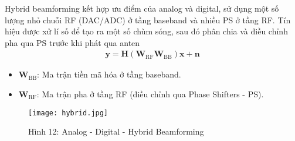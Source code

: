 \documentclass[a4paper,13pt]{article}
\begin{document}
Hybrid beamforming kết hợp ưu điểm của analog và digital, sử dụng một số lượng nhỏ chuỗi RF (DAC/ADC) ở tầng baseband và nhiều PS ở tầng RF. Tín hiệu được xử lí số để tạo ra một số chùm sóng, sau đó phân chia và điều chỉnh pha qua PS trước khi phát qua anten
\begin{align}
\mathbf{y} = \mathbf{H} (\mathbf{W}_{\text{RF}} \mathbf{W}_{\text{BB}}) \mathbf{x} + \mathbf{n} \tag{7}
\end{align}
\begin{itemize}
    \item \(\mathbf{W}_{\text{BB}}\): Ma trận tiền mã hóa ở tầng baseband.
    \item \(\mathbf{W}_{\text{RF}}\): Ma trận pha ở tầng RF (điều chỉnh qua Phase Shifters - PS).
\end{itemize}

\begin{figure}[htbp]
    \centering
    \texttt{[image: hybrid.jpg]}
    \caption*{Hình 12: Analog - Digital - Hybrid Beamforming  \cite{key8} }
    \label{fig:model}
\end{figure}


\clearpage
\end{document}
